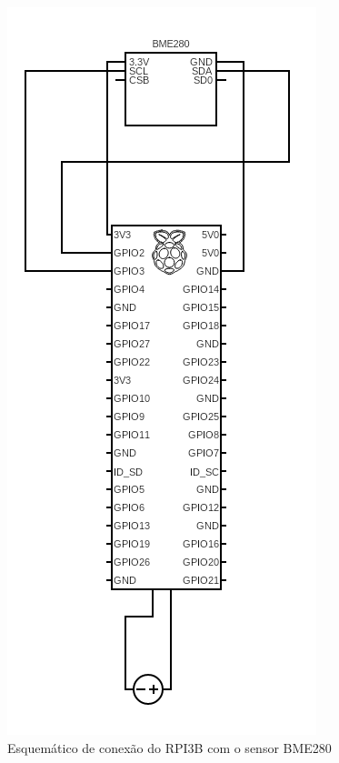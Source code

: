 \begin{figure}[!htpb]
\centering
\includegraphics[width=.9\columnwidth]{figuras/circuit.png}
\caption{Esquemático de conexão do RPI3B com o sensor BME280}
\label{fig:exemplo_esquem}
\end{figure}

